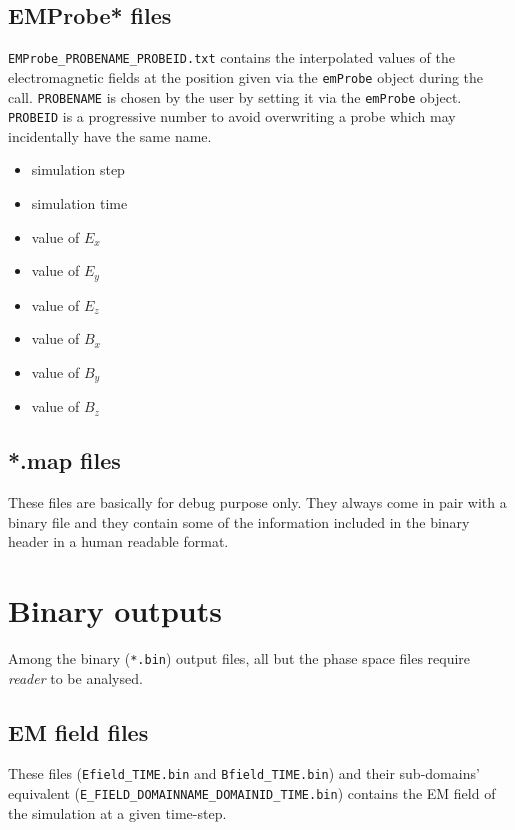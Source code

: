 \documentclass[11pt,a4paper]{report}
\begin{document}
\subsection{EMProbe* files}
\verb+EMProbe_PROBENAME_PROBEID.txt+ contains the interpolated values of the electromagnetic fields at the position given via the \verb+emProbe+ object during the call. \verb+PROBENAME+ is chosen by the user by setting it via the \verb+emProbe+ object. \verb+PROBEID+ is a progressive number to avoid overwriting a probe which may incidentally have the same name.
\begin{itemize}
\item simulation step
\item simulation time
\item value of $E_x$
\item value of $E_y$
\item value of $E_z$
\item value of $B_x$
\item value of $B_y$
\item value of $B_z$
\end{itemize}

\subsection{*.map files}
These files are basically for debug purpose only. They always come in pair with a binary file and they contain some of the information included in the binary header in a human readable format.

\section{Binary outputs}
Among the binary (\verb+*.bin+) output files, all but the phase space files require \emph{reader} to be analysed.
\subsection{EM field files}
These files (\verb+Efield_TIME.bin+ and \verb+Bfield_TIME.bin+) and their sub-domains' equivalent (\verb+E_FIELD_DOMAINNAME_DOMAINID_TIME.bin+) contains the EM field of the simulation at a given time-step.
\end{document}
